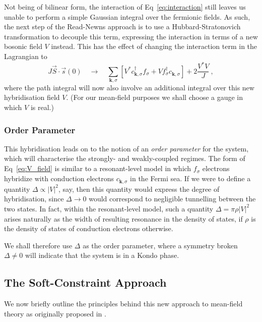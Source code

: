 Not being of bilinear form, the interaction of Eq~\eqref{eq:interaction} still leaves us unable to perform a simple Gaussian integral over the fermionic fields. As such, the next step of the Read-Newns approach is to use a Hubbard-Stratonovich \cite{ManyBodyPhysics} transformation to decouple this term, expressing the interaction in terms of a new bosonic field $ V $ instead. This has the effect of changing the interaction term in the Lagrangian to
\begin{equation}
J\vec{S}\cdot\vec{s}(0) \quad \rightarrow \quad \sum_{\boldsymbol{k}, \sigma} \left[ V^{\ast} c^{\dagger}_{\boldsymbol{k}, \sigma} f^{}_{\sigma} + V f^{\dagger}_{\sigma} c^{}_{\boldsymbol{k}, \sigma} \right] + 2 \frac{V^{\ast} V}{J} ~,
\label{eq:V_field}
\end{equation}
where the path integral will now also involve an additional integral over this new hybridisation field $ V $. (For our mean-field purposes we shall choose a gauge in which $ V $ is real.)

\subsubsection{Order Parameter}

This hybridisation leads on to the notion of an \emph{order parameter} for the system, which will characterise the strongly- and weakly-coupled regimes. The form of Eq~\eqref{eq:V_field} is similar to a resonant-level model in which $ f_{\sigma} $ electrons hybridize with conduction electrons $ c^{}_{\boldsymbol{k}, \sigma} $ in the Fermi sea. If we were to define a quantity $ \Delta \propto | V |^2 $, say, then this quantity would express the degree of hybridisation, since $ \Delta \rightarrow 0 $ would correspond to negligible tunnelling between the two states. In fact, within the resonant-level model, such a quantity $ \Delta = \pi \rho |V|^2 $ arises naturally as the width of resulting resonance in the density of states, if $ \rho $ is the density of states of conduction electrons otherwise.

We shall therefore use $ \Delta $ as the order parameter, where a symmetry broken $ \Delta \neq 0 $ will indicate that the system is in a Kondo phase.

\subsection{The Soft-Constraint Approach}

We now briefly outline the principles behind this new approach to mean-field theory as originally proposed in \cite{Draft}.

